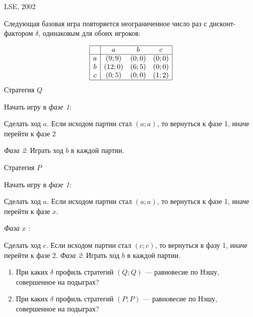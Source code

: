 \begin{problem}
\begin{source}
LSE, 2002
\end{source}
Следующая базовая игра повторяется неограниченное число раз с дисконт-фактором  $\delta $, одинаковым для обоих игроков:

\[\begin{array}{|c|ccc|}  \hline {} & {a} & {b} & {c} \\  \hline {a} & {\left(9;9\right)} & {\left(0;0\right)} & {\left(0;0\right)} \\ {b} & {\left(12;0\right)} & {\left(6;5\right)} & {\left(0;0\right)} \\ {c} & {\left(0;5\right)} & {\left(0;0\right)} & {\left(1;2\right)} \\  \hline  \end{array}\]
Стратегия  $Q$\par
Начать игру в {\it фазе 1}:\par
Сделать ход  $a$. Если исходом партии стал  $\left(a;a\right)$, то вернуться к фазе 1, иначе перейти к фазе 2\par
{\it Фаза 2}: Играть ход  $b$  в каждой партии.\par

Стратегия  $P$\par
Начать игру в {\it фазе 1}:\par
Сделать ход  $a$. Если исходом партии стал  $\left(a;a\right)$, то вернуться к фазе 1, иначе перейти к фазе  $x$.\par
{\it Фаза } $x$ :\par
Сделать ход  $c$. Если исходом партии стал  $\left(c;c\right)$, то вернуться в фазу 1, иначе перейти к фазе 2.
{\it Фаза 2}: Играть ход  $b$  в каждой партии.\par
\begin{enumerate}
\item При каких  $\delta $  профиль стратегий  $\left(Q;Q\right)$  — равновесие по Нэшу, совершенное на подыграх?\par
\item При каких  $\delta $  профиль стратегий  $\left(P;P\right)$  — равновесие по Нэшу, совершенное на подыграх?
\end{enumerate}


\begin{sol}

\end{sol}
\end{problem}



